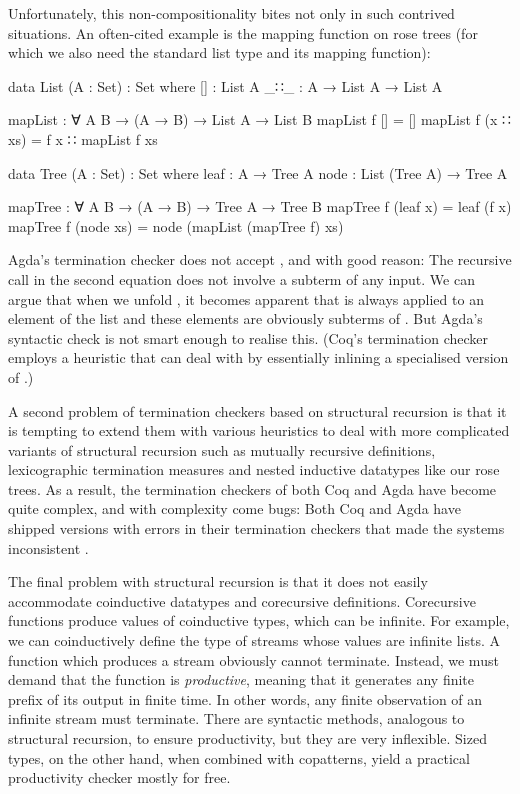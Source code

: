 Unfortunately, this non-compositionality bites not only in such contrived
situations. An often-cited example is the mapping function on rose trees (for
which we also need the standard list type and its mapping function):
\begin{code}
  data List (A : Set) : Set where
    []  : List A
    _∷_ : A → List A → List A

  mapList : ∀ {A B} → (A → B) → List A → List B
  mapList f []       = []
  mapList f (x ∷ xs) = f x ∷ mapList f xs

  data Tree (A : Set) : Set where
    leaf : A → Tree A
    node : List (Tree A) → Tree A

  mapTree : ∀ {A B} → (A → B) → Tree A → Tree B
  mapTree f (leaf x)  = leaf (f x)
  mapTree f (node xs) = node (mapList (mapTree f) xs)
\end{code}
Agda's termination checker does not accept , and with good
reason: The recursive call in the second equation does not involve a subterm of
any input. We can argue that when we unfold , it becomes apparent
that  is always applied to an element of the list  and
these elements are obviously subterms of . But Agda's syntactic check
is not smart enough to realise this. (Coq's termination checker employs a
heuristic that can deal with  by essentially inlining a
specialised version of .)

A second problem of termination checkers based on structural recursion is that
it is tempting to extend them with various heuristics to deal with more
complicated variants of structural recursion such as mutually recursive
definitions, lexicographic termination measures and nested inductive datatypes
like our rose trees. As a result, the termination checkers of both Coq and Agda
have become quite complex, and with complexity come bugs: Both Coq and Agda have
shipped versions with errors in their termination checkers that made the systems
inconsistent \cite{coqbug2013,agdabug2013}.

The final problem with structural recursion is that it does not easily
accommodate coinductive datatypes and corecursive definitions. Corecursive
functions produce values of coinductive types, which can be infinite. For
example, we can coinductively define the type of streams whose values are
infinite lists. A function which produces a stream obviously cannot terminate.
Instead, we must demand that the function is \emph{productive}, meaning that it
generates any finite prefix of its output in finite time. In other words, any
finite observation of an infinite stream must terminate. There are syntactic
methods, analogous to structural recursion, to ensure productivity, but they are
very inflexible. Sized types, on the other hand, when combined with copatterns,
yield a practical productivity checker mostly for free.

